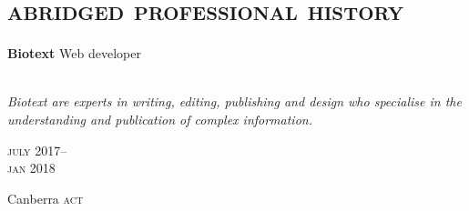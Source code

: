 
\vspace{-0.6cm}
\section*{\textsc{abridged professional history}}
\vspace{-0.2cm}





\begin{minipage}[t]{\mainboxwidth\textwidth}
\textbf{Biotext}\phantom{..} Web developer\\
\\
{\small
\textit{
Biotext are experts in writing, editing, publishing and design who specialise
in the understanding and publication of complex information.}
\par}
\end{minipage}
\begin{minipage}[t]{\detailboxwidth\textwidth}
{
\hfill \textsc{july} 2017--\\ 
\hspace*{0pt} \hfill \textsc{jan} 2018
\par
{\small\hfill Canberra \textsc{act}}
}
\end{minipage}
\\

